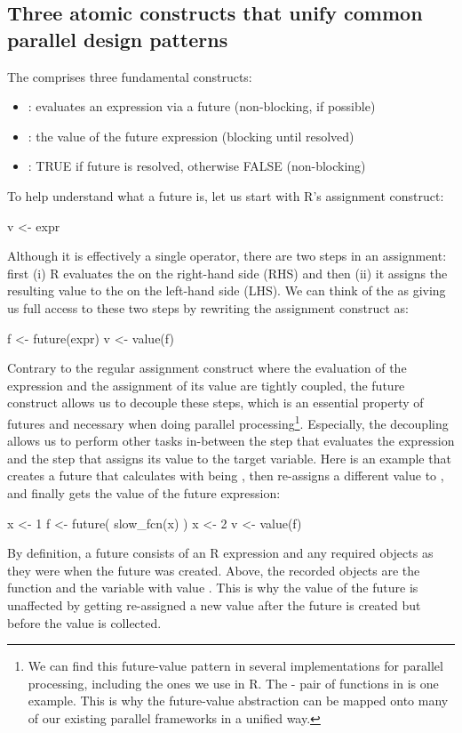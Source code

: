 \subsection{Three atomic constructs that unify common parallel design patterns}
\label{low-level-generalized-parallelization-model}

The  comprises three fundamental constructs:
\begin{itemize}
\item
   : evaluates an expression via a
  future (non-blocking, if possible)
\item
   : the value of the future
  expression  (blocking until resolved)
\item
   : TRUE if future is resolved,
  otherwise FALSE (non-blocking)
\end{itemize}
%
To help understand what a future is, let us start with R's assignment
construct:
\begin{example}
v <- expr
\end{example}
Although it is effectively a single operator, there are two steps in
an assignment: first (i) R evaluates the  on the
right-hand side (RHS) and then (ii) it assigns the resulting value to
the  on the left-hand side (LHS).  We can think of
the  as giving us full access to these two steps by
rewriting the assignment construct as:
\begin{example}
f <- future(expr)
v <- value(f)
\end{example}
Contrary to the regular assignment construct where the evaluation of
the expression and the assignment of its value are tightly coupled,
the future construct allows us to decouple these steps, which is an
essential property of futures and necessary when doing parallel
processing\footnote{We can find this future-value pattern in several
implementations for parallel processing, including the ones we use in
R. The - pair of functions
in  is one example.  This is why the future-value
abstraction can be mapped onto many of our existing parallel
frameworks in a unified way.}.  Especially, the decoupling allows
us to perform other tasks in-between the step that evaluates the
expression and the step that assigns its value to the target variable.
%
Here is an example that creates a future that calculates
 with  being , then re-assigns
a different value to , and finally gets the value of the
future expression:
\begin{example}
x <- 1
f <- future({
  slow_fcn(x)
})
x <- 2
v <- value(f)
\end{example}
By definition, a future consists of an R expression and any required
objects as they were when the future was created. Above, the recorded
objects are the function  and the variable 
with value .  This is why the value of the future is
unaffected by  getting re-assigned a new value after the
future is created but before the value is collected.

